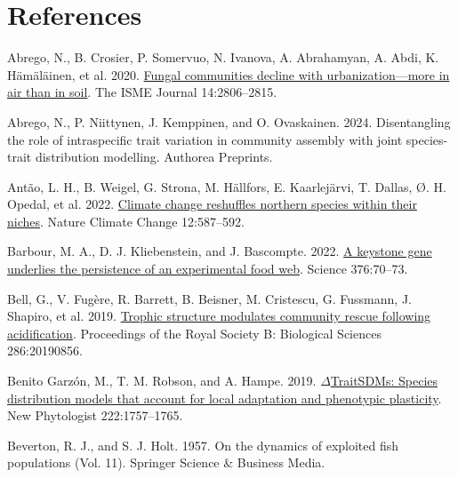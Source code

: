 \documentclass[
]{article}
\newlength{\cslhangindent}
\newlength{\cslentryspacingunit} %
\newenvironment{CSLReferences}[2] %
 {%
  \setlength{\parindent}{0pt}
  \ifodd #1
  \let\oldpar\par
  \def\par{\hangindent=\cslhangindent\oldpar}
  \fi
  \setlength{\parskip}{#2\cslentryspacingunit}
 }%
 {}
\begin{document}
\hypertarget{references}{%
\section{References}\label{references}}

\hypertarget{refs}{}
\begin{CSLReferences}{0}{0}
\leavevmode{}%
Abrego, N., B. Crosier, P. Somervuo, N. Ivanova, A. Abrahamyan, A. Abdi, K. Hämäläinen, et al. 2020. \href{https://doi.org/10.1038/s41396-020-0732-1}{{Fungal communities decline with urbanization---more in air than in soil}}. The ISME Journal 14:2806--2815.

\leavevmode{}%
Abrego, N., P. Niittynen, J. Kemppinen, and O. Ovaskainen. 2024. Disentangling the role of intraspecific trait variation in community assembly with joint species-trait distribution modelling. Authorea Preprints.

\leavevmode{}%
Antão, L. H., B. Weigel, G. Strona, M. Hällfors, E. Kaarlejärvi, T. Dallas, Ø. H. Opedal, et al. 2022. \href{https://doi.org/10.1038/s41558-022-01381-x}{Climate change reshuffles northern species within their niches}. Nature Climate Change 12:587--592.

\leavevmode{}%
Barbour, M. A., D. J. Kliebenstein, and J. Bascompte. 2022. \href{https://doi.org/10.1126/science.abf2232}{A keystone gene underlies the persistence of an experimental food web}. Science 376:70--73.

\leavevmode{}%
Bell, G., V. Fugère, R. Barrett, B. Beisner, M. Cristescu, G. Fussmann, J. Shapiro, et al. 2019. \href{https://doi.org/10.1098/rspb.2019.0856}{Trophic structure modulates community rescue following acidification}. Proceedings of the Royal Society B: Biological Sciences 286:20190856.

\leavevmode{}%
Benito Garzón, M., T. M. Robson, and A. Hampe. 2019. \href{https://doi.org/10.1111/nph.15716}{\(\Delta\)TraitSDMs: Species distribution models that account for local adaptation and phenotypic plasticity}. New Phytologist 222:1757--1765.

\leavevmode{}%
Beverton, R. J., and S. J. Holt. 1957. On the dynamics of exploited fish populations (Vol. 11). Springer Science \& Business Media.


\end{CSLReferences}
\end{document}
